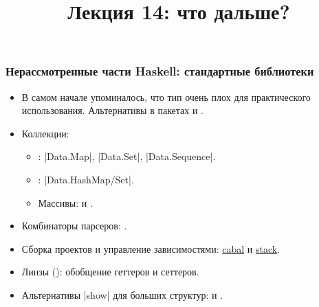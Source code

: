 \documentclass[11pt]{beamer}
\title{Лекция 14: что дальше?}
\begin{document}
\begin{frame}[plain]
  \maketitle
\end{frame}

\begin{frame}[fragile]
  \frametitle{Нерассмотренные части Haskell: стандартные библиотеки}
  \begin{itemize}
    \item В самом начале упоминалось, что тип  очень плох для практического использования. Альтернативы в пакетах  и .
    \item Коллекции:
          \begin{itemize}
            \item {}: \haskinline|Data.Map|, \haskinline|Data.Set|, \haskinline|Data.Sequence|.
            \item {}: \haskinline|Data.Hash{Map/Set}|.
            \item Массивы:  и .
          \end{itemize}
    \item Комбинаторы парсеров: .
    \item Сборка проектов и управление зависимостями: \href{https://cabal.readthedocs.io/en/stable/}{cabal} и \href{https://docs.haskellstack.org/en/stable/}{stack}.
    \item Линзы (): обобщение геттеров и сеттеров.
    \item Альтернативы \haskinline|show| для больших структур:  и .
  \end{itemize}
\end{frame}
\end{document}
